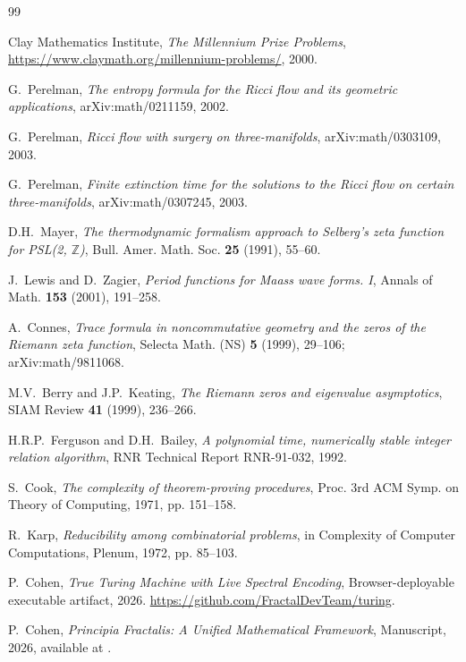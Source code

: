 \documentclass[11pt,a4paper]{article}
\theoremstyle{definition}
\theoremstyle{remark}
\begin{document}
\begin{thebibliography}{99}

Clay Mathematics Institute,
\emph{The Millennium Prize Problems},
\url{https://www.claymath.org/millennium-problems/}, 2000.

G.~Perelman,
\emph{The entropy formula for the Ricci flow and its geometric
applications},
arXiv:math/0211159, 2002.

G.~Perelman,
\emph{Ricci flow with surgery on three-manifolds},
arXiv:math/0303109, 2003.

G.~Perelman,
\emph{Finite extinction time for the solutions to the Ricci flow on
certain three-manifolds},
arXiv:math/0307245, 2003.

D.H.~Mayer,
\emph{The thermodynamic formalism approach to Selberg's zeta function
for PSL(2, $\mathbb{Z}$)},
Bull. Amer. Math. Soc. \textbf{25} (1991), 55--60.

J.~Lewis and D.~Zagier,
\emph{Period functions for Maass wave forms. I},
Annals of Math. \textbf{153} (2001), 191--258.

A.~Connes,
\emph{Trace formula in noncommutative geometry and the zeros of the
Riemann zeta function},
Selecta Math. (NS) \textbf{5} (1999), 29--106;
arXiv:math/9811068.

M.V.~Berry and J.P.~Keating,
\emph{The Riemann zeros and eigenvalue asymptotics},
SIAM Review \textbf{41} (1999), 236--266.

H.R.P.~Ferguson and D.H.~Bailey,
\emph{A polynomial time, numerically stable integer relation algorithm},
RNR Technical Report RNR-91-032, 1992.

S.~Cook,
\emph{The complexity of theorem-proving procedures},
Proc. 3rd ACM Symp. on Theory of Computing, 1971, pp. 151--158.

R.~Karp,
\emph{Reducibility among combinatorial problems},
in Complexity of Computer Computations, Plenum, 1972, pp. 85--103.

P.~Cohen,
\emph{True Turing Machine with Live Spectral Encoding},
Browser-deployable executable artifact, 2026.
\url{https://github.com/FractalDevTeam/turing}.

P.~Cohen,
\emph{Principia Fractalis: A Unified Mathematical Framework},
Manuscript, 2026, available at \cite{github_repo}.


\end{thebibliography}
\end{document}
